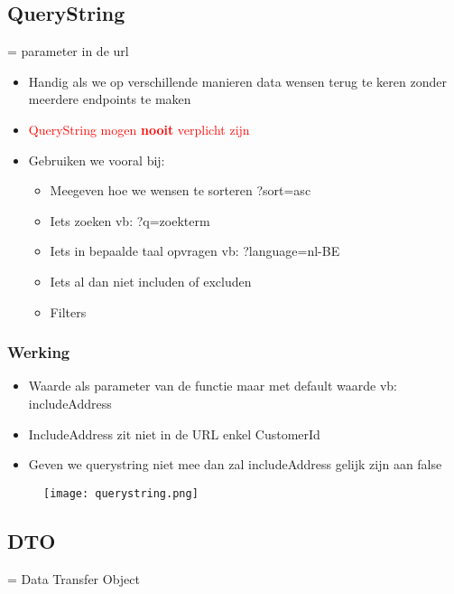 \documentclass{article}
\begin{document}
\subsection{QueryString}

= parameter in de url

\begin{itemize}
    \item Handig als we op verschillende manieren data wensen terug te keren zonder meerdere endpoints te maken
    \item \textcolor{red}{QueryString mogen \textbf{nooit} verplicht zijn}
    \item Gebruiken we vooral bij:
    \begin{itemize}
        \item Meegeven hoe we wensen te sorteren ?sort=asc
        \item Iets zoeken vb: ?q=zoekterm
        \item Iets in bepaalde taal opvragen vb: ?language=nl-BE
        \item Iets al dan niet includen of excluden
        \item Filters
    \end{itemize}
\end{itemize}

\subsubsection{Werking}

\begin{itemize}
    \item Waarde als parameter van de functie maar met default waarde vb: includeAddress
    \item IncludeAddress zit niet in de URL enkel CustomerId
    \item Geven we querystring niet mee dan zal includeAddress gelijk zijn aan false
\end{itemize}

\begin{figure}[H]
    \centering
    \texttt{[image: querystring.png]}
    \caption{}
\end{figure}

\subsection{DTO}

= Data Transfer Object
\end{document}
